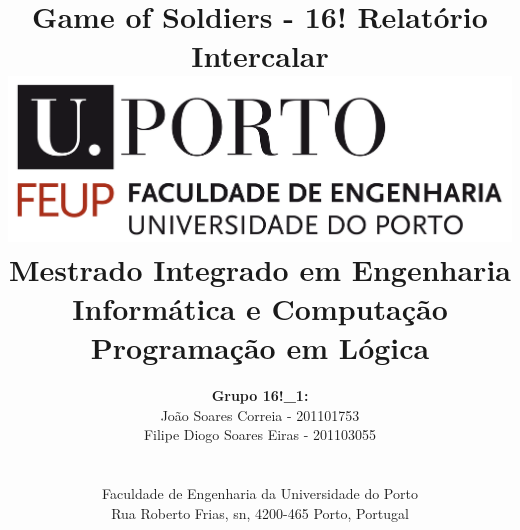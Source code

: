 \documentclass[a4paper]{article}
\begin{document}
\setlength{\textwidth}{16cm}
\setlength{\textheight}{22cm}

\title{\Huge\textbf{Game of Soldiers - 16!}\linebreak\linebreak\linebreak
\Large\textbf{Relatório Intercalar}\linebreak\linebreak
\linebreak\linebreak
\includegraphics[scale=0.1]{feup-logo.png}\linebreak\linebreak
\linebreak\linebreak
\Large{Mestrado Integrado em Engenharia Informática e Computação} \linebreak\linebreak
\Large{Programação em Lógica}\linebreak
}

\author{\textbf{Grupo 16!\_1:}\\
João Soares Correia - 201101753 \\
Filipe Diogo Soares Eiras - 201103055 \\
\linebreak\linebreak \\
 \\ Faculdade de Engenharia da Universidade do Porto \\ Rua Roberto Frias, s\/n, 4200-465 Porto, Portugal \linebreak\linebreak\linebreak
\linebreak\linebreak\vspace{1cm}}

\maketitle
\thispagestyle{empty}
\end{document}
